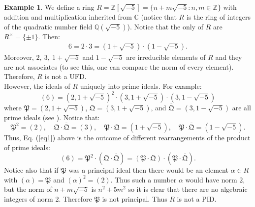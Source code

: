 \documentclass[12pt]{article}
\theoremstyle{definition}
\newtheorem{exa}{Example}
\newcommand{\Ints}{\mathbb{Z}}
\newcommand{\Complex}{\mathbb{C}}
\newcommand{\Rats}{\mathbb{Q}}
\begin{document}
\begin{exa}
We define a ring $R=\Ints[\sqrt{-5}]=\{ n+m\sqrt{-5} : n,m\in\Ints\}$ with addition and multiplication inherited from $\Complex$ (notice that $R$ is the ring of integers of the quadratic number field $\Rats(\sqrt{-5})$). Notice that the only  of $R$ are $R^\times=\{ \pm 1 \}$. Then:
\begin{eqnarray} \label{eq1} 6=2\cdot 3 = (1+\sqrt{-5})\cdot (1-\sqrt{-5}).\end{eqnarray}
Moreover, $2,\ 3,\ 1+\sqrt{-5}$ and $1-\sqrt{-5}$ are irreducible elements of $R$ and they are not associates (to see this, one can compare the norm of every element). Therefore, $R$ is not a UFD. \\

However, the ideals of $R$  uniquely into prime ideals. For example:
$$(6)=(2,1+\sqrt{-5})^2\cdot (3,1+\sqrt{-5})\cdot (3,1-\sqrt{-5})$$
where $\mathfrak{P}=(2,1+\sqrt{-5})$, $\mathfrak{Q}=(3,1+\sqrt{-5})$, and $\overline{\mathfrak{Q}}=(3,1-\sqrt{-5})$ are all prime ideals (see ). Notice that:
$$\mathfrak{P}^2=(2),\quad \mathfrak{Q}\cdot\overline{\mathfrak{Q}}=(3),\quad  \mathfrak{P}\cdot\mathfrak{Q}=(1+\sqrt{-5}),\quad  \mathfrak{P}\cdot \overline{\mathfrak{Q}}=(1-\sqrt{-5}).$$
Thus, Eq. (\ref{eq1}) above is the outcome of different rearrangements of the product of prime ideals:
$$(6)=\mathfrak{P}^2\cdot(\mathfrak{Q}\cdot \overline{\mathfrak{Q}})=(\mathfrak{P}\cdot \mathfrak{Q})\cdot (\mathfrak{P}\cdot \overline{\mathfrak{Q}}).$$
Notice also that if $\mathfrak{P}$ was a principal ideal then there would be an element $\alpha \in R$ with $(\alpha)=\mathfrak{P}$ and $(\alpha)^2 = (2)$. Thus such a number $\alpha$ would have norm $2$, but the norm of $n+m\sqrt{-5}$ is $n^2+5m^2$ so it is clear that there are no algebraic integers of norm $2$. Therefore $\mathfrak{P}$ is not principal. Thus $R$ is not a PID. 
\end{exa}
\end{document}
